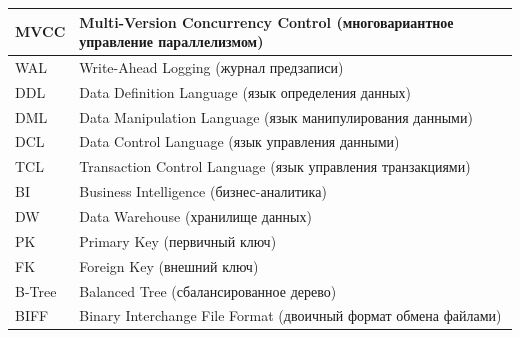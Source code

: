 \documentclass{SibFU-docs}
\begin{document}
{\begin{tabular}{|p{}|p{}|}
\hline
MVCC & Multi-Version Concurrency Control (многовариантное управление параллелизмом) \\
\hline
WAL & Write-Ahead Logging (журнал предзаписи) \\
\hline
DDL & Data Definition Language (язык определения данных) \\
\hline
DML & Data Manipulation Language (язык манипулирования данными) \\
\hline
DCL & Data Control Language (язык управления данными) \\
\hline
TCL & Transaction Control Language (язык управления транзакциями) \\
\hline
BI & Business Intelligence (бизнес-аналитика) \\
\hline
DW & Data Warehouse (хранилище данных) \\
\hline
PK & Primary Key (первичный ключ) \\
\hline
FK & Foreign Key (внешний ключ) \\
\hline
B-Tree & Balanced Tree (сбалансированное дерево) \\
\hline
BIFF & Binary Interchange File Format (двоичный формат обмена файлами) \\
\hline
\end{tabular}
}

\clearpage
\nocite{*}
\printbibliography[heading=bibliography]
\end{document}
